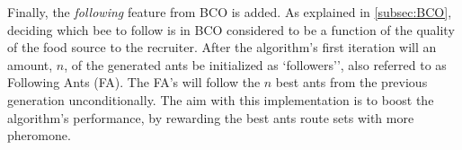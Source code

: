 Finally, the \textit{following} feature from BCO is added. As explained in \vref{subsec:BCO}, deciding which bee to follow is in BCO considered to be a function of the quality of the food source to the recruiter. After the algorithm's first iteration will an amount, $n$, of the generated ants be initialized as `followers'', also referred to as Following Ants (FA). The FA's will follow the $n$ best ants from the previous generation unconditionally. The aim with this implementation is to boost the algorithm's performance, by rewarding the best ants route sets with more pheromone.





